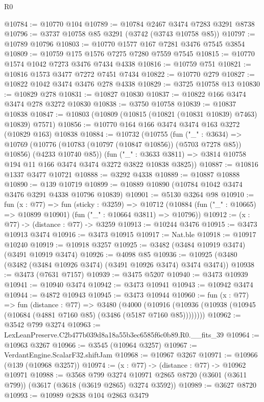 \begin{lexlean}{R0}
\begin{coremodule}
@10784 := @10770 @104
@10789 := @10784 @2467 @3474 @7283 @3291 @8738
@10796 := @3737 @10758 @85 @3291 (@3742 (@3743 @10758 @85))
@10797 := @10789 @10796
@10803 := @10770 @1577 @167 @7281 @3476 @7545 @3854
@10809 := @10759 @175 @1576 @7275 @7280 @7559 @7545
@10815 := @10770 @1574 @1042 @7273 @3476 @7434 @4338
@10816 := @10759 @751
@10821 := @10816 @1573 @3477 @7272 @7451 @7434
@10822 := @10770 @279
@10827 := @10822 @1042 @3474 @3476 @278 @4338
@10829 := @3725 @10758 @13
@10830 := @10829 @278
@10831 := @10827 @10830
@10837 := @10822 @166 @3474 @3474 @278 @3272 @10830
@10838 := @3750 @10758
@10839 := @10837 @10838
@10847 := @10803 (@10809 (@10815 (@10821 (@10831 @10839) @7463) @10839) @7571)
@10856 := @10770 @164 @166 @3474 @3474 @163 @3272 (@10829 @163) @10838
@10884 := @10732
    (@10755
      (fun ("_" : @3634) =>
      @10769 (@10776 (@10783 (@10797 (@10847 @10856)) (@5703 @7278 @85)) @10856) (@4233 @10740 @85))
      (fun ("_" : @3633 @3811) => @3814 @10758 @194 @11 @166 @3474 @3474 @3272 @3822 @10838 @3825))
@10887 := @10816 @1337 @3477 @10721
@10888 := @3292 @4338
@10889 := @10887 @10888
@10890 := @139 @10719
@10899 := @10889 @10890 (@10784 @1042 @3474 @3476 @3291 @4338 @10796 @10839)
@10901 := @5130 @3264 @98
@10910 := fun (x : @77) =>
  fun (sticky : @3259) =>
  @10712 (@10884 (fun ("_" : @10665) => @10899 @10901) (fun ("_" : @10664 @3811) => @10796))
@10912 := (x : @77) -> (distance : @77) -> @3259
@10913 := @10244 @3476
@10915 := @3473 @10913 @3474
@10916 := @3473 @10915
@10917 := Nat.ble
@10918 := @10917 @10240
@10919 := @10918 @3257
@10925 := @3482 (@3484 @10919 @3474) (@3491 @10919 @3474)
@10926 := @4098 @85
@10936 := @10925 (@3480 (@3482 (@3484 @10926 @3474) (@3491 @10926 @3474) @3474 @3474))
@10938 := @3473 (@7631 @7157)
@10939 := @3475 @5207
@10940 := @3473 @10939
@10941 := @10940 @3474
@10942 := @3473 @10941
@10943 := @10942 @3474
@10944 := @4872 @10943
@10945 := @3473 @10944
@10960 := fun (x : @77) =>
  fun (distance : @77) =>
  @3480
    (@4000 (@10916 (@10936 (@10938 (@10945 (@10684 (@4881 @7160 @85) (@3486 (@5187 @7160 @85))))))))
@10962 := @3542 @799 @3274
@10963 := LexLeanPreserve.C2b477b039d8a18a55b3ec6585f6c0b89.R0.__fits_39
@10964 := @10963 @3267
@10966 := @3545 (@10964 @3257)
@10967 := VerdantEngine.ScalarF32.shiftJam
@10968 := @10967 @3267
@10971 := @10966 (@139 (@10968 @3257))
@10974 := (x : @77) -> (distance : @77) -> @10962 @10971
@10988 := @3568
    @799
    @3274
    @10971
    @2865
    @8720
    (@3601 (@3611 @799))
    (@3617 (@3618 (@3619 @2865) @3274 @3592))
@10989 := @3627 @8720
@10993 := @10989 @2838 @104 @2863 @3479

\end{coremodule}
\end{lexlean}
